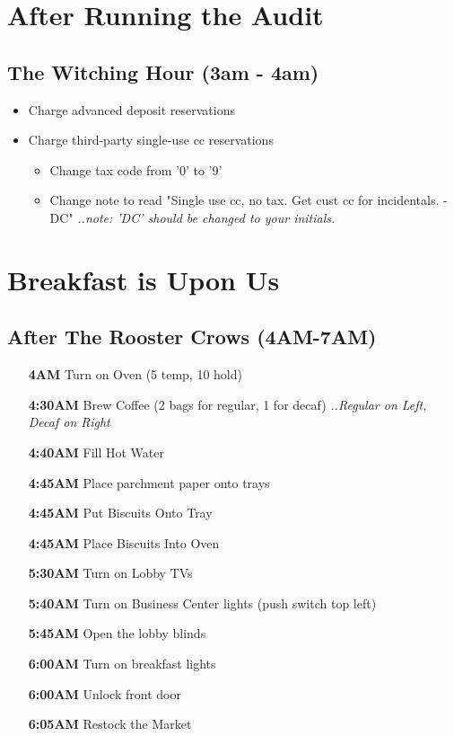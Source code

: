 \section*{After Running the Audit}
\subsection*{The Witching Hour (3am - 4am)}
\begin{itemize}
    \item Charge advanced deposit reservations
    \item Charge third-party single-use cc reservations
    \begin{itemize}
        \item Change tax code from '0' to '9'
        \item Change note to read "Single use cc, no tax. Get cust cc for incidentals. -DC"\newline
        \textit{..note: 'DC' should be changed to your initials.}
    \end{itemize}
\end{itemize}

\section*{Breakfast is Upon Us}
\subsection*{After The Rooster Crows (4AM-7AM)}
\begin{itemize}
    \item[\textbf{4AM}] Turn on Oven (5 temp, 10 hold)
    \item[\textbf{4:30AM}] Brew Coffee (2 bags for regular, 1 for decaf)\newline
    \textit{..Regular on Left, Decaf on Right}
    \item[\textbf{4:40AM}] Fill Hot Water
    \item[\textbf{4:45AM}] Place parchment paper onto trays
    \item[\textbf{4:45AM}] Put Biscuits Onto Tray
    \item[\textbf{4:45AM}] Place Biscuits Into Oven
    \item[\textbf{5:30AM}] Turn on Lobby TVs
    \item[\textbf{5:40AM}] Turn on Business Center lights (push switch top left)
    \item[\textbf{5:45AM}] Open the lobby blinds
    \item[\textbf{6:00AM}] Turn on breakfast lights
    \item[\textbf{6:00AM}] Unlock front door
    \item[\textbf{6:05AM}] Restock the Market
\end{itemize}
\newpage

